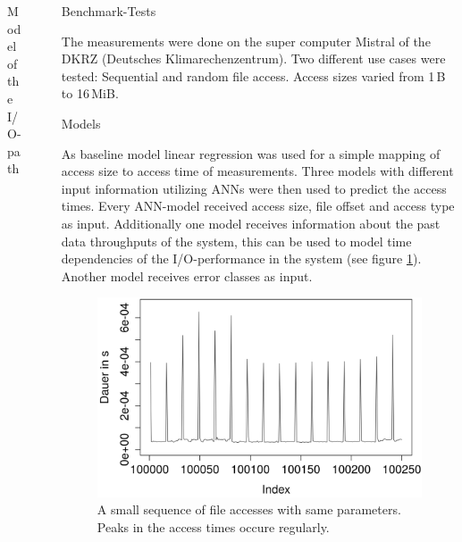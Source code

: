 \documentclass[final]{beamer}
\newlength{\sepwid}
\newlength{\onecolwid}
\begin{document}
\begin{frame}[t]
\begin{columns}[t]
\begin{column}{\onecolwid}
\begin{block}{Model of the I/O-path}
	
\end{block}
	
\end{column} %

\begin{column}{\sepwid}\end{column} %

\begin{column}{\onecolwid} %
	
\begin{block}{Benchmark-Tests}
	
	The measurements were done on the super computer Mistral of the DKRZ (Deutsches Klimarechenzentrum).
	Two different use cases were tested: Sequential and random file access.
	Access sizes varied from 1\,B to 16\,MiB.
	
\end{block}

\begin{block}{Models}
	
	As baseline model linear regression was used for a simple mapping of access size to access time of measurements.
	Three models with different input information utilizing ANNs were then used to predict the access times.
	Every ANN-model received access size, file offset and access type as input.
	Additionally one model receives information about the past data throughputs of the system, this can be used to model time dependencies of the I/O-performance in the system (see figure \ref{time_dep}). Another model receives error classes as input.
	
		\begin{figure}
			\label{time_dep}
			\includegraphics[width=0.8\linewidth]{src/plot_From100001to100250_read_seq.png}
			\caption{A small sequence of file accesses with same parameters. Peaks in the access times occure regularly.}
		\end{figure}
	

\end{block}
\end{column}
\end{columns}
\end{frame}
\end{document}
